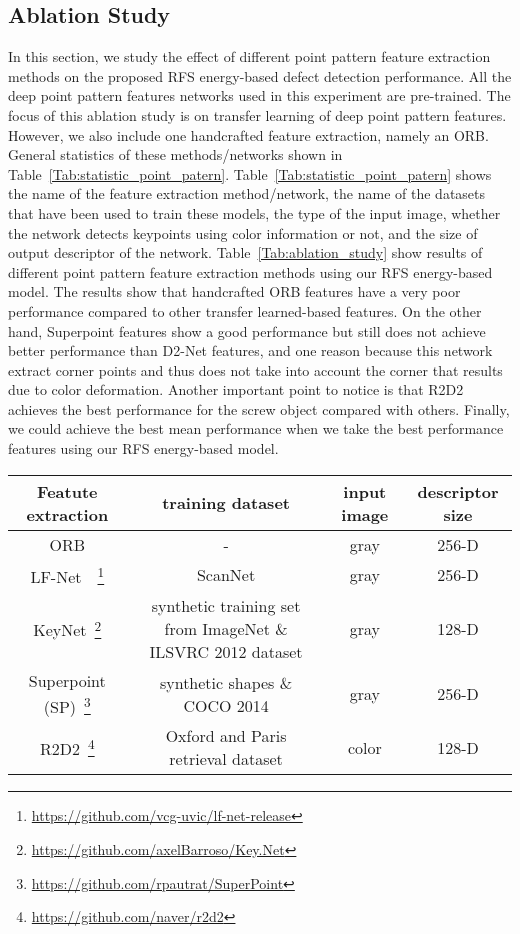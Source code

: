 \documentclass[journal]{IEEEtran}
\let\MYoriglatexcaption\caption
\renewcommand{\caption}[2][\relax]{\MYoriglatexcaption[#2]{#2}}
\begin{document}
\subsection{Ablation Study}

In this section, we study the effect of different point pattern feature extraction methods on  the proposed RFS energy-based defect detection performance. All the deep point pattern features networks used in this experiment are pre-trained. The focus of this ablation study is on transfer learning of deep point pattern features. However, we also include one handcrafted feature extraction, namely an ORB\cite{rublee2011orb}.  General statistics of these methods/networks shown in Table~\ref{Tab:statistic_point_patern}. Table~\ref{Tab:statistic_point_patern} shows the name of the feature extraction method/network, the name of the datasets that have been used to train these models, the type of the input image, whether the network detects keypoints using color information or not, and the size of output descriptor of the network. Table~\ref{Tab:ablation_study} show results of different point pattern feature extraction methods using our RFS energy-based model. The results show that handcrafted ORB features have a very poor performance compared to other transfer learned-based features.
On the other hand, Superpoint features show a good performance but still does not achieve better performance than D2-Net features, and one reason because this network extract corner points and thus does not take into account the corner that results  due to color deformation. Another important point to notice is that R2D2 achieves the best performance for the screw object compared with others. Finally, we could achieve the best mean performance when we take the best performance features using our RFS energy-based model. 

\begin{table*}[!h]
\caption{General statistics of point pattern feature extraction methods used in the ablation study.}
\centering
\begin{tabular}{cccc}
	    \toprule
	Featute extraction &training dataset& input image& descriptor size\\
	\hline
	ORB&-& gray&256-D\\
	LF-Net~\cite{ono2018lf}~\footnote{\url{https://github.com/vcg-uvic/lf-net-release}}& ScanNet& gray& 256-D\\
	KeyNet~\footnote{\url{https://github.com/axelBarroso/Key.Net}}&synthetic training set from ImageNet \& 
	ILSVRC 2012 dataset&gray& 128-D\\
	Superpoint (SP)~\footnote{\url{https://github.com/rpautrat/SuperPoint}}&synthetic shapes \& COCO 2014& gray&256-D \\
	R2D2~\footnote{\url{https://github.com/naver/r2d2}}& Oxford and Paris retrieval dataset&color& 128-D\\
	    \toprule
\end{tabular}
\label{Tab:statistic_point_patern}
\end{table*}
\end{document}
